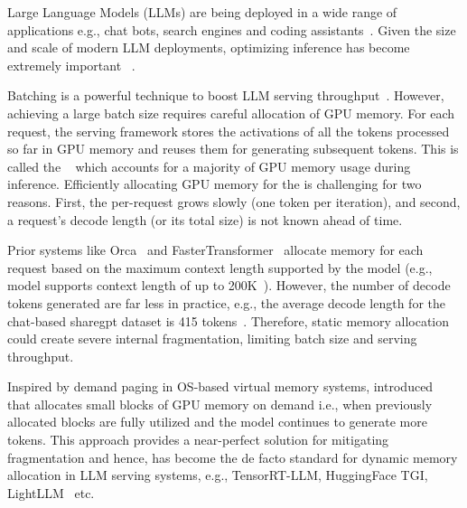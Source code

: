 Large Language Models (LLMs) are being deployed in a wide range of applications e.g., chat bots, search engines and coding assistants~\cite{openai2022gpt4techreport,chowdhery2022Palm,bingai,bard,githubcopilot,amazoncodewhisperer,replitghostwriter}. Given the size and scale of modern LLM deployments, optimizing inference has become extremely important ~\cite{sarathi2023,splitfuse2024,patel2023splitwise,distserve2024,tetriinfer,vllmsosp,orca,pod-attn-2024}. %

Batching is a powerful technique to boost LLM serving throughput~\cite{orca,vllmsosp,patel2023splitwise,sarathiserve2024}. However, achieving a large batch size requires careful allocation of GPU memory. For each request, the serving framework stores the activations of all the tokens processed so far in GPU memory and reuses them for generating subsequent tokens. This is called the \kvcache~\cite{orca,sarathi2023,patel2023splitwise} which accounts for a majority of GPU memory usage during inference. Efficiently allocating GPU memory for the \kvcache is challenging for two reasons. First, the per-request \kvcache grows slowly (one token per iteration), and second, a request's decode length (or its total \kvcache size) is not known ahead of time.

  

Prior systems like Orca~\cite{orca} and FasterTransformer~\cite{fastertransformer} allocate memory for each request based on the maximum context length supported by the model (e.g., \yimedium model supports context length of up to 200K~\cite{yi-34b-200k-hf}). However, the number of decode tokens generated are far less in practice, e.g., the average decode length for the chat-based sharegpt dataset is 415 tokens~\cite{sarathiserve2024}. Therefore, static memory allocation could create severe internal fragmentation, limiting batch size and serving throughput.


Inspired by demand paging in OS-based virtual memory systems, \vllm introduced \pa~\cite{vllmsosp} that allocates small blocks of GPU memory on demand i.e., when previously allocated blocks are fully utilized and the model continues to generate more tokens. This approach provides a near-perfect solution for mitigating fragmentation and hence, \pa has become the de facto standard for dynamic memory allocation in LLM serving systems, e.g., TensorRT-LLM, HuggingFace TGI,  LightLLM~\cite{trtllmgithub, hftgi, lightllm:github} etc.




